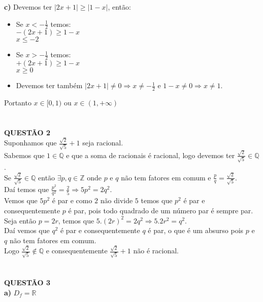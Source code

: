 \documentclass[12pt]{article}
\begin{document}
\textbf{c)} 
Devemos ter $|2x+1|\geq|1-x|$, então:
\begin{itemize}
\item Se $x<-\frac{1}{2}$ temos:\\
$-(2x+1)\geq1-x$\\
$x\leq-2$\\
\item Se $x>-\frac{1}{2}$ temos:\\
$+(2x+1)\geq1-x$\\
$x\geq0$\\
\item Devemos ter também $|2x+1|\neq0 \Rightarrow x\neq-\frac{1}{2}$ e $1-x\neq0 \Rightarrow x\neq 1$.\\
\end{itemize}
Portanto $x\in[0,1)$ ou $x\in(1,+\infty)$\\
\\
\\

\textbf{QUESTÃO 2}\\
Suponhamos que $\frac{\sqrt{2}}{\sqrt{5}}+1$ seja racional.\\
Sabemos que $1\in\mathbb{Q}$ e que a soma de racionais é racional, logo devemos ter $\frac{\sqrt{2}}{\sqrt{5}}\in\mathbb{Q}$.\\
Se $\frac{\sqrt{2}}{\sqrt{5}}\in\mathbb{Q}$ então $\exists p,q\in\mathbb{Z}$ onde $p$ e $q$ não tem fatores em comum e $\frac{p}{q}=\frac{\sqrt{2}}{\sqrt{5}}$.\\
Daí temos que $\frac{p^2}{q^2}=\frac{2}{5}\Rightarrow5p^2=2q^2$.\\
Vemos que $5p^2$ é par e como $2$ não divide $5$ temos que $p^2$ é par e consequentemente $p$ é par, pois todo quadrado de um número par é sempre par.\\
Seja então $p=2r$, temos que $5.(2r)^2=2q^2\Rightarrow5.2r^2=q^2$.\\
Daí vemos que $q^2$ é par e consequentemente $q$ é par, o que é um absurso pois $p$ e $q$ não tem fatores em comum.\\
Logo $\frac{\sqrt{2}}{\sqrt{5}}\not\in\mathbb{Q}$ e consequentemente $\frac{\sqrt{2}}{\sqrt{5}}+1$ não é racional.\\
\\
\\

\textbf{QUESTÃO 3}\\

\textbf{a)} 
$D_f=\mathbb{R}$
\\
\end{document}
